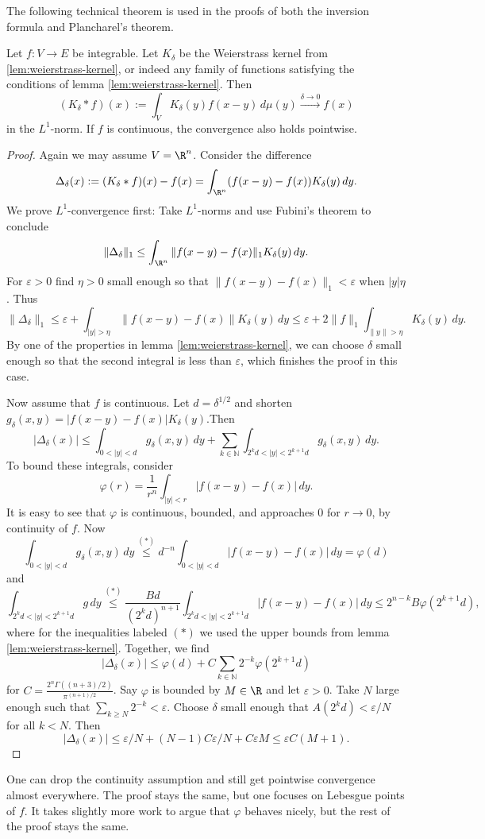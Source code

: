The following technical theorem is used in the proofs of both the inversion formula and Plancharel's theorem.
\begin{theorem}
\label{thm:kernel-approximation}
\lean{}
Let $f:V\to E$ be integrable. Let $K_\delta$ be the Weierstrass kernel from \ref{lem:weierstrass-kernel},
or indeed any family of functions satisfying the conditions of lemma \ref{lem:weierstrass-kernel}. Then
$$(K_\delta\ast f)(x):=\int_V K_\delta(y)f(x-y)\,d\mu(y)\xrightarrow{\delta\to0}f(x)$$ in the $L^1$-norm.
If $f$ is continuous, the convergence also holds pointwise.
\end{theorem}
\begin{proof}
Again we may assume $V=\R^n$. Consider the difference $$\Delta_\delta(x):=(K_\delta\ast f)(x)-f(x)=
\int_{\R^n}(f(x-y)-f(x))K_\delta(y)\,dy.$$ We prove $L^1$-convergence first:
Take $L^1$-norms and use Fubini's theorem to conclude
$$\|\Delta_\delta\|_1\leq\int_{\R^n}\|f(x-y)-f(x)\|_1K_\delta(y)\,dy.$$ For $\varepsilon>0$ find $\eta>0$
small enough so that $\|f(x-y)-f(x)\|_1<\varepsilon$ when $|y|\eta$. Thus
$$\|\Delta_\delta\|_1\leq\varepsilon+\int_{|y|>\eta}\|f(x-y)-f(x)\|K_\delta(y)\,dy\leq\varepsilon+2\|f\|_1\int_{\|y\|>\eta}K_\delta(y)\,dy.$$
By one of the properties in lemma \ref{lem:weierstrass-kernel}, we can choose $\delta$ small enough so that the second integral
is less than $\varepsilon$, which finishes the proof in this case.

Now assume that $f$ is continuous.
Let $d=\delta^{1/2}$ and shorten $g_\delta(x,y)=|f(x-y)-f(x)|K_\delta(y)$.Then
 $$|\Delta_\delta(x)|\leq\int_{0<|y|<d}g_\delta(x,y)\,dy+\sum_{k\in\mathbb N}\int_{2^kd<|y|<2^{k+1}d}g_\delta(x,y)\,dy.$$
 To bound these integrals, consider
 $$\varphi(r)=\frac1{r^n}\int_{|y|<r}|f(x-y)-f(x)|\,dy.$$
 It is easy to see that $\varphi$ is continuous, bounded, and approaches $0$ for $r\to0$, by continuity of $f$.
 Now $$\int_{0<|y|<d}g_\delta(x,y)\,dy\overset{(\ast)}\leq d^{-n}\int_{0<|y|<d}|f(x-y)-f(x)|\,dy=\varphi(d)$$ and
 $$\int_{2^kd<|y|<2^{k+1}d}g\,dy\overset{(\ast)}\leq
 \frac{Bd}{(2^kd)^{n+1}}\int_{2^kd<|y|<2^{k+1}d}|f(x-y)-f(x)|\,dy\leq2^{n-k}B\varphi(2^{k+1}d),$$
 where for the inequalities labeled $(\ast)$ we used the upper bounds from lemma \ref{lem:weierstrass-kernel}.
 Together, we find
 $$|\Delta_\delta(x)|\leq\varphi(d)+C\sum_{k\in\mathbb N}2^{-k}\varphi(2^{k+1}d)$$ for
 $C=\frac{2^n\Gamma((n+3)/2)}{\pi^{(n+1)/2}}$. Say $\varphi$ is bounded by $M\in\R$ and let $\varepsilon>0$.
 Take $N$ large enough such that $\sum_{k\geq N}2^{-k}<\varepsilon$. Choose $\delta$ small enough that
 $A(2^kd)<\varepsilon/N$ for all $k<N$. Then
 $$|\Delta_\delta(x)|\leq\varepsilon/N+(N-1)C\varepsilon/N+C\varepsilon M\leq \varepsilon C(M+1).$$
\end{proof}
\begin{remark}
  One can drop the continuity assumption and still get pointwise convergence almost everywhere. The proof stays the same,
  but one focuses on Lebesgue points of $f$. It takes slightly more work to argue that $\varphi$ behaves nicely,
  but the rest of the proof stays the same.
\end{remark}


